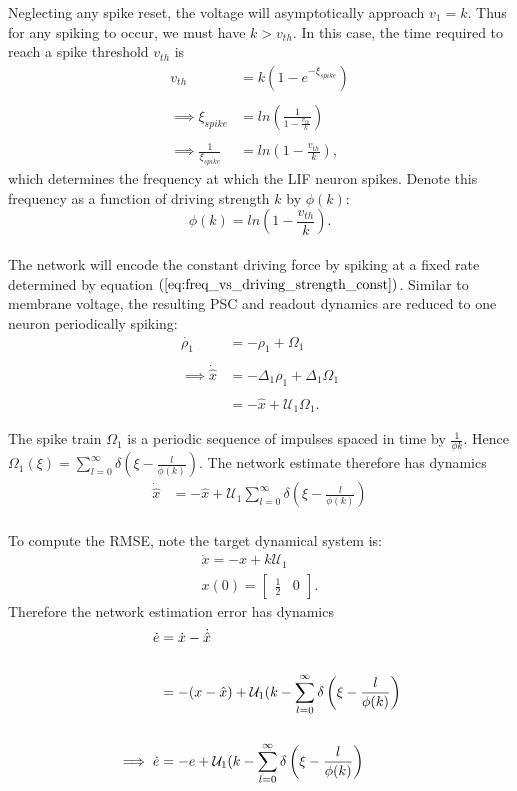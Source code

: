 Neglecting any spike reset, the voltage will asymptotically approach $v_1=k$. Thus for any spiking to occur, we must have $k > v_{th}$. In this case, the time required to reach a spike threshold $v_{th}$ is 
\begin{align*}
v_{th} &= k (1 - e^{-\xi_{spike}})\\
\\
\implies 
\xi_{spike} &= ln\left(\frac{1}
{
1-\frac{v_{th}}{k}
}\right)\\
\\ \implies
\frac{1}{\xi_{spike}} &= ln \left( 1 - \frac{v_{th}}{k} \right),
\end{align*}
which determines the frequency  at which the LIF neuron spikes.  Denote this frequency as a function of driving strength $k$ by $\phi(k)$:
\begin{equation}
\label{eq:freq_vs_driving_strength_const}
\phi(k)  = ln \left( 1 - \frac{v_{th}}{k} \right).
\end{equation}
\\
The network will encode the constant driving force by spiking at a fixed rate  determined by equation $(\ref{eq:freq_vs_driving_strength_const})$. Similar to membrane voltage, the resulting PSC and readout dynamics are reduced to one neuron periodically spiking:
\begin{align*}
\dot{\rho_1} &= -\rho_1 + \Omega_1 \\ 
\\
\implies 
\dot{\hat{x}} &= - \Delta_1 \rho_1 + \Delta_1 \Omega_1\\
\\ 
&= - \hat{x} + \mathcal{U}_1 \Omega_1. 
\end{align*}

The spike train $\Omega_1$ is a periodic sequence of impulses spaced in time by $\frac{1}{\phi{k}}$. Hence $\Omega_1(\xi) = \sum_{l=0}^{\infty} \delta \left(\xi - \frac{l}{\phi(k)}\right).$
The network estimate therefore has dynamics
\begin{align*}
\dot{\hat{x}} &= -\hat{x}  + \mathcal{U}_1 \sum_{l=0}^{\infty} \delta \left(\xi - \frac{l}{\phi(k)}\right)\\\
\end{align*}

To compute the RMSE, note the target dynamical system is:
\begin{align*}
\dot{x} = - x + k 
 \mathcal{U}_1 \\
 x(0) = \begin{bmatrix} \frac{1}{2} & 0 \end{bmatrix}.
\end{align*}
Therefore the network estimation error has dynamics
\begin{align}
\dot{e} &= \dot{x}-\dot{\hat{x}} \notag \\
\notag \\
&= -(x - \hat{x}) + \mathcal{U}_1  (k - \sum_{l=0}^{\infty} \delta \left(\xi - \frac{l}{\phi(k)}\right) \notag\\
\notag \\
\implies \dot{e} &= -e + \mathcal{U}_1  (k - \sum_{l=0}^{\infty} \delta \left(\xi - \frac{l}{\phi(k)}\right)
\end{align}

\clearpage










